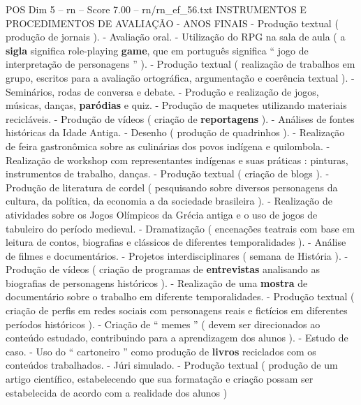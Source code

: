 \begin{textsample}{POS Dim 5 – rn – Score 7.00 – rn/rn\_ef\_56.txt}  \label{ex:f5_pos_143}
INSTRUMENTOS E PROCEDIMENTOS DE AVALIAÇÃO - ANOS FINAIS - Produção textual ( produção de jornais ). - Avaliação oral. - Utilização do RPG na sala de aula ( a \textbf{sigla} significa role-playing \textbf{game}, que em português significa “ jogo de interpretação de personagens ” ). - Produção textual ( realização de trabalhos em grupo, escritos para a avaliação ortográfica, argumentação e coerência textual ). - Seminários, rodas de conversa e debate. - Produção e realização de jogos, músicas, danças, \textbf{paródias} e quiz. - Produção de maquetes utilizando materiais recicláveis. - Produção de vídeos ( criação de \textbf{reportagens} ). - Análises de fontes históricas da Idade Antiga. - Desenho ( produção de quadrinhos ). - Realização de feira gastronômica sobre as culinárias dos povos indígena e quilombola. - Realização de workshop com representantes indígenas e suas práticas : pinturas, instrumentos de trabalho, danças. - Produção textual ( criação de blogs ). - Produção de literatura de cordel ( pesquisando sobre diversos personagens da cultura, da política, da economia a da sociedade brasileira ). - Realização de atividades sobre os Jogos Olímpicos da Grécia antiga e o uso de jogos de tabuleiro do período medieval. - Dramatização ( encenações teatrais com base em leitura de contos, biografias e clássicos de diferentes temporalidades ). - Análise de filmes e documentários. - Projetos interdisciplinares ( semana de História ). - Produção de vídeos ( criação de programas de \textbf{entrevistas} analisando as biografias de personagens históricos ). - Realização de uma \textbf{mostra} de documentário sobre o trabalho em diferente temporalidades. - Produção textual ( criação de perfis em redes sociais com personagens reais e fictícios em diferentes períodos históricos ). - Criação de “ memes ” ( devem ser direcionados ao conteúdo estudado, contribuindo para a aprendizagem dos alunos ). - Estudo de caso. - Uso do “ cartoneiro ” como produção de \textbf{livros} reciclados com os conteúdos trabalhados. - Júri simulado. - Produção textual ( produção de um artigo científico, estabelecendo que sua formatação e criação possam ser estabelecida de acordo com a realidade dos alunos )

\end{textsample}
